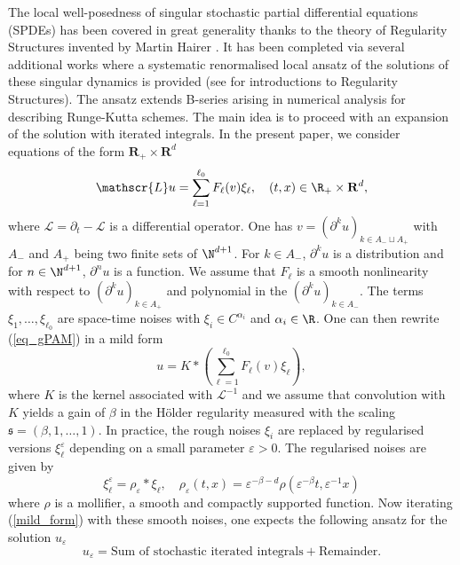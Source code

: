 \documentclass[11pt]{preprint}
\def\s{\mathfrak{s}}
\def\eps{\varepsilon}
\let\eps\varepsilon
\def\eqref#1{(\ref{#1})}
\newcommand{\bfR}{\mathbf{R}}
\newcommand{\scrL}{\mathscr{L}}
\begin{document}
	The local well-posedness of singular stochastic partial differential equations (SPDEs) has been covered in great generality thanks to the theory of Regularity Structures invented by Martin Hairer \cite{Hai14}. It has been completed via several additional works \cite{BHZ,CH16,BCCH} where a systematic renormalised local ansatz of the solutions of these singular dynamics is provided (see \cite{FrizHai,BH26} for introductions to Regularity Structures). 
	The ansatz extends B-series arising in numerical analysis for describing Runge-Kutta schemes. The main idea is to proceed with an expansion of the solution with iterated integrals. 
	In the present paper, we consider equations of the form
 $\bfR_+\times\bfR^d$
	\begin{equation}\label{eq_gPAM}
		\scrL u = \sum_{\ell=1}^{\ell_0} F_\ell(v)\xi_\ell, \quad (t,x) \in \R_+ \times \bfR^{d},
	\end{equation}
	where $\scrL=\partial_t-\mathcal{L}$  is a differential operator. One has $ v= (\partial^k u)_{k \in A_- \sqcup A_+} $ with $A_-$ and $A_+$ being two finite sets of $ \N^{d+1} $. For $k \in A_-$, $\partial^k u$ is a distribution and for $ n \in \N^{d+1} $, $\partial^n u$ is a function. We assume that  $F_\ell$ is a smooth nonlinearity with respect to $(\partial^k u)_{k \in A_+}$ and polynomial in the $(\partial^k u)_{k \in A_-}$. The terms $\xi_1,\dots,\xi_{\ell_0}$ are space-time  noises with  $\xi_i \in  C^{\alpha_i}$ and $\alpha_i \in \R$. One can then rewrite \eqref{eq_gPAM} in a mild form
	\begin{equation*}
		\label{mild_form}
		u = K * \left(  \sum_{\ell=1}^{\ell_0} F_\ell(v)\xi_\ell \right),
	\end{equation*}
	where $ K$ is the kernel associated with $ \scrL^{-1} $ and we assume that convolution with $K$ yields a gain of $\beta$ in the Hölder regularity measured with the scaling $ \s = (\beta,1,\dots,1) $. In practice, the rough noises $\xi_i$ are replaced by regularised versions  $\xi_{\ell}^\eps$ depending on a small parameter $\eps >0$. The regularised noises are given by
	\begin{equation*}
		\xi_{\ell}^\eps= \rho_{\eps} * \xi_{\ell}, \quad \rho_{\eps}(t,x) = \eps^{- \beta - d} \rho( \eps^{-\beta} t , \eps^{-1} x )
	\end{equation*}
	where $\rho$ is a mollifier, a smooth and compactly supported function. 
Now iterating \eqref{mild_form} with these smooth noises, one expects the following ansatz for the solution $u_{\eps}$
	\begin{equation*}
		u_{\eps} = \text{Sum of stochastic iterated integrals} + \text{Remainder}.
	\end{equation*}
\end{document}
